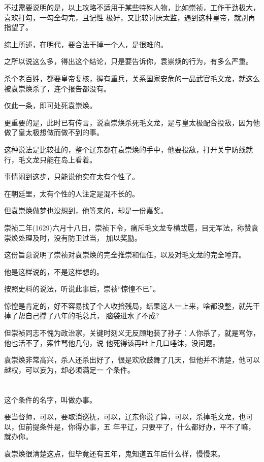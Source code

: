 \documentclass[11pt,a4paper,onecolumn]{article}
\begin{document}
不过需要说明的是，以上攻略不适用于某些特殊人物，比如崇祯，工作干劲极大，喜欢打勾，一勾全勾完，且记性
极好，又比较讨厌太监，遇到这种皇帝，就别再指望了。

综上所述，在明代，要合法干掉一个人，是很难的。

之所以说这么多，得出这个结论，只是要告诉你，袁崇焕的行为，有多么严重。

杀个老百姓，都要皇帝复核，握有重兵，关系国家安危的一品武官毛文龙，就这么被袁崇焕杀了，连个报告都没有。

仅此一条，即可处死袁崇焕。

更重要的是，此时已有传言，说袁崇焕杀死毛文龙，是与皇太极配合投敌，因为他做了皇太极想做而做不到的事。

这种说法是比较扯的，整个辽东都在袁崇焕的手中，他要投敌，打开关宁防线就行，毛文龙只能在岛上看着。

事情闹到这步，只能说他实在太有个性了。

在朝廷里，太有个性的人注定是混不长的。

但袁崇焕做梦也没想到，他等来的，却是一份嘉奖。

崇祯二年(1629)六月十八日，崇祯下令，痛斥毛文龙专横跋扈，目无军法，称赞袁崇焕处理及时，没有防卫过当，
加以奖励。

这份旨意说明了崇祯对袁崇焕的完全推崇和信任，以及对毛文龙的完全唾弃。

他是这样说的，不是这样想的。

按照史料的说法，听说此事后，崇祯``惊惶不已''。

惊惶是肯定的，好不容易找了个人收拾残局，结果这人一上来，啥都没整，就先干掉了帮自己撑了八年的毛总兵，
脑袋进水了不成?

但崇祯同志不愧为政治家，关键时刻义无反顾地装了孙子：人你杀了，就是骂你，他也活不了，索性骂他几句，说
他死得该再吐上几口唾沫，没问题。

袁崇焕非常高兴，杀人还杀出好了，很是欢欣鼓舞了几天，但他并不清楚，他可以越权，可以妄为，却必须满足一
个条件。

\section[\thesection]{}

这个条件的名字，叫做办事。

要当督师，可以，要取消巡抚，可以，辽东你说了算，可以，杀掉毛文龙，也可以，但前提条件是，你得办事，五
年平辽，只要平了，什么都好办，平不了嘛，就办你。

袁崇焕很清楚这点，但毕竟还有五年，鬼知道五年后什么样，慢慢来。
\end{document}
